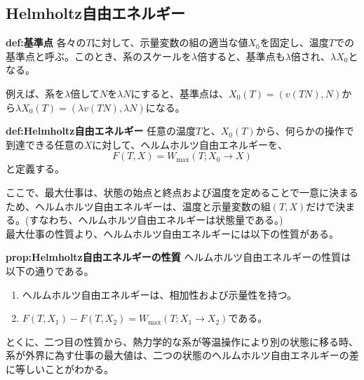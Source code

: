 \documentclass[a4paper,11pt]{jsarticle}
\begin{document}
\subsection{Helmholtz自由エネルギー}
\begin{itembox}[l]{\textbf{def:基準点}}
    各々の$T$に対して、示量変数の組の適当な値$X_0$を固定し、温度$T$での基準点と呼ぶ。このとき、系のスケールを$\lambda$倍すると、基準点も$\lambda$倍され、$\lambda X_0$となる。
\end{itembox}
例えば、系を$\lambda$倍して$N$を$\lambda N$にすると、基準点は、$X_0(T) =(v(TN),N)$から$\lambda X_0(T) = (\lambda v(TN),\lambda N)$になる。\\

\begin{itembox}[l]{\textbf{def:Helmholtz自由エネルギー}}
    任意の温度$T$と、$X_0(T)$から、何らかの操作で到達できる任意の$X$に対して、ヘルムホルツ自由エネルギーを、
    \begin{equation}
        F(T,X) = W_{\text{max}}(T;X_0\rightarrow X)
    \end{equation}
    と定義する。

\end{itembox}
ここで、最大仕事は、状態の始点と終点および温度を定めることで一意に決まるため、ヘルムホルツ自由エネルギーは、温度と示量変数の組$(T,X)$だけで決まる。(すなわち、ヘルムホルツ自由エネルギーは状態量である。)\\

最大仕事の性質より、ヘルムホルツ自由エネルギーには以下の性質がある。\\
\begin{itembox}[l]{\textbf{prop:Helmholtz自由エネルギーの性質}}
    ヘルムホルツ自由エネルギーの性質は以下の通りである。
    \begin{enumerate}
        \item ヘルムホルツ自由エネルギーは、相加性および示量性を持つ。
        \item $F(T,X_1)-F(T,X_2)=W_{\text{max}}(T;X_1\rightarrow X_2)$である。
    \end{enumerate}
\end{itembox}
とくに、二つ目の性質から、熱力学的な系が等温操作により別の状態に移る時、系が外界に為す仕事の最大値は、二つの状態のヘルムホルツ自由エネルギーの差に等しいことがわかる。\\
\end{document}
